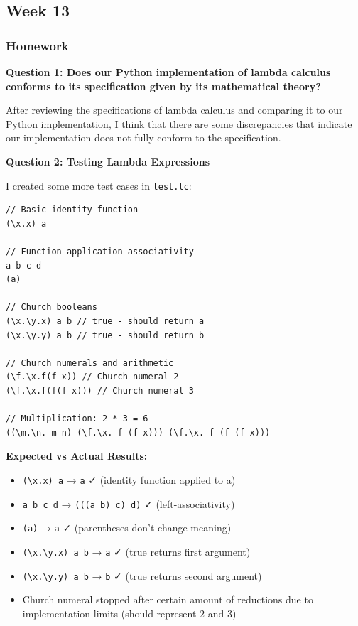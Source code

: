 \documentclass{article}
\theoremstyle{theorem}
\theoremstyle{definition}
\theoremstyle{remark}
\begin{document}
\subsection{Week 13}

\subsubsection{Homework}

\textbf{Question 1: Does our Python implementation of lambda calculus conforms to its specification given by its mathematical theory?}

After reviewing the specifications of lambda calculus and comparing it to our Python implementation, I think that there are some discrepancies that indicate our implementation does not fully conform to the specification.

\textbf{Question 2: Testing Lambda Expressions}

I created some more test cases in \texttt{test.lc}:

\begin{lstlisting}
// Basic identity function
(\x.x) a

// Function application associativity
a b c d
(a)

// Church booleans
(\x.\y.x) a b // true - should return a
(\x.\y.y) a b // true - should return b

// Church numerals and arithmetic
(\f.\x.f(f x)) // Church numeral 2
(\f.\x.f(f(f x))) // Church numeral 3

// Multiplication: 2 * 3 = 6
((\m.\n. m n) (\f.\x. f (f x))) (\f.\x. f (f (f x)))
\end{lstlisting}

\textbf{Expected vs Actual Results:}
\begin{itemize}
\item \texttt{(\textbackslash x.x) a} → \texttt{a} ✓ (identity function applied to a)
\item \texttt{a b c d} → \texttt{(((a b) c) d)} ✓ (left-associativity)
\item \texttt{(a)} → \texttt{a} ✓ (parentheses don't change meaning)
\item \texttt{(\textbackslash x.\textbackslash y.x) a b} → \texttt{a} ✓ (true returns first argument)
\item \texttt{(\textbackslash x.\textbackslash y.y) a b} → \texttt{b} ✓ (true returns second argument)
\item Church numeral stopped after certain amount of reductions due to implementation limits (should represent 2 and 3)
\end{itemize}
\end{document}
